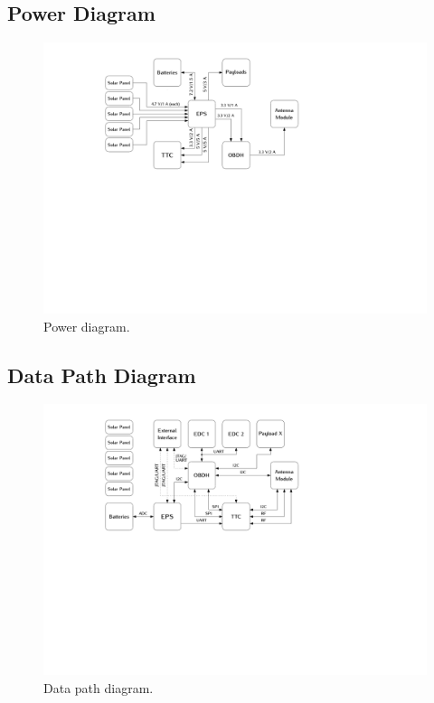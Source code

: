 \subsection{Power Diagram}

\begin{figure}[!ht]
    \begin{center}
        \includegraphics[width=\textwidth]{figures/power_diagram.pdf}
        \caption{Power diagram.}
        \label{fig:power-diagram}
    \end{center}
\end{figure}


\subsection{Data Path Diagram}

\begin{figure}[!ht]
    \begin{center}
        \includegraphics[width=\textwidth]{figures/data_path_diagram.pdf}
        \caption{Data path diagram.}
        \label{fig:data-path}
    \end{center}
\end{figure}

